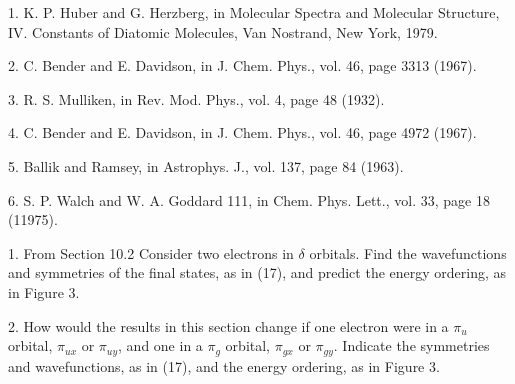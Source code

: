 

\item {1.} K. P. Huber and G. Herzberg, in Molecular Spectra and 
Molecular Structure, IV. Constants of Diatomic Molecules, Van Nostrand, 
New York, 1979.

\item {2.} C. Bender and E. Davidson, in J. Chem. Phys., vol. 46, 
page 3313 (1967).

\item {3.} R. S. Mulliken, in Rev. Mod. Phys., vol. 4, page 48 (1932).

\item {4.} C. Bender and E. Davidson, in J. Chem. Phys., vol. 46, 
page 4972 (1967).

\item {5.} Ballik and	Ramsey, in Astrophys. J., vol. 137, page 84 (1963).

\item {6.} S. P. Walch and W. A. Goddard 111, in Chem. Phys. Lett., 
vol. 33, page 18 (11975).

\bigskip


\item {1.} 	From Section 10.2  Consider two electrons in $\delta$ 
orbitals.  Find the wavefunctions and
symmetries of the final states, as in (17), and predict the energy
ordering, as in Figure 3.

\item {2.}	How would the results in this section change if one electron were in
a $\pi_u$ orbital, $\pi_{ux}$ or $\pi_{uy}$, and one in a $\pi_g$ 
orbital, $\pi_{gx}$ or $\pi_{gy}$.  Indicate the symmetries and 
wavefunctions, as in (17), and the energy ordering, as in Figure 3.
\vfill\eject
\bigskip
